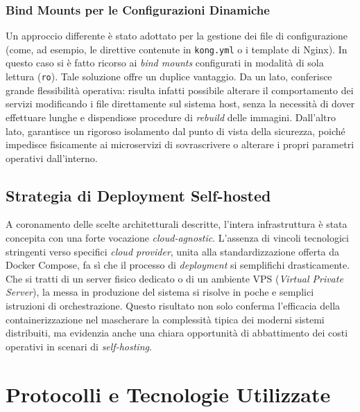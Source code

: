 \documentclass[12pt,a4paper]{report}
\begin{document}
\subsection{Bind Mounts per le Configurazioni Dinamiche}
Un approccio differente è stato adottato per la gestione dei file di
configurazione (come, ad esempio, le direttive contenute in
\texttt{kong.yml} o i template di Nginx). In questo caso si è fatto
ricorso ai \textit{bind mounts} configurati in modalità di sola
lettura (\texttt{ro}). Tale soluzione offre un duplice vantaggio. Da
un lato, conferisce grande flessibilità operativa: risulta infatti
possibile alterare il comportamento dei servizi modificando i file
direttamente sul sistema host, senza la necessità di dover effettuare
lunghe e dispendiose procedure di \textit{rebuild} delle immagini.
Dall'altro lato, garantisce un rigoroso isolamento dal punto di vista
della sicurezza, poiché impedisce fisicamente ai microservizi di
sovrascrivere o alterare i propri parametri operativi dall'interno.

\section{Strategia di Deployment Self-hosted}
A coronamento delle scelte architetturali descritte, l'intera
infrastruttura è  stata concepita con una forte vocazione
\textit{cloud-agnostic}. L'assenza di  vincoli tecnologici stringenti
verso specifici \textit{cloud provider}, unita  alla
standardizzazione offerta da Docker Compose, fa sì che il processo di
\textit{deployment} si semplifichi drasticamente. Che si tratti di un
server fisico  dedicato o di un ambiente VPS (\textit{Virtual Private
Server}), la messa in  produzione del sistema si risolve in poche e
semplici istruzioni di orchestrazione.  Questo risultato non solo
conferma l'efficacia della containerizzazione nel  mascherare la
complessità tipica dei moderni sistemi distribuiti, ma evidenzia
anche una chiara opportunità di abbattimento dei costi operativi in
scenari  di \textit{self-hosting}.

\chapter{Protocolli e Tecnologie Utilizzate}
\label{cap:protocolli}
\end{document}
